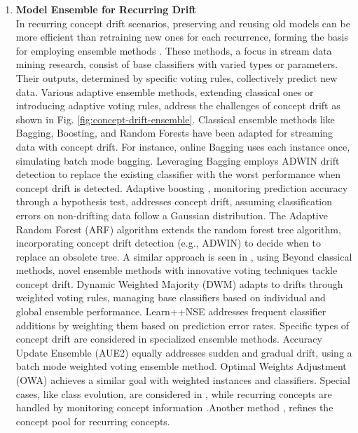 \begin{enumerate}[label=\Alph*.]
\item \textbf{Model Ensemble for Recurring Drift} \\
In recurring concept drift scenarios, preserving and reusing old models can be more efficient than retraining new ones for each recurrence, forming the basis for employing ensemble methods \cite{sun2018concept}. These methods, a focus in stream data mining research, consist of base classifiers with varied types or parameters. Their outputs, determined by specific voting rules, collectively predict new data. Various adaptive ensemble methods, extending classical ones or introducing adaptive voting rules, address the challenges of concept drift as shown in Fig. \ref{fig:concept-drift-ensemble}.
Classical ensemble methods like Bagging, Boosting, and Random Forests have been adapted for streaming data with concept drift. For instance, online Bagging \cite{oza2001experimental} uses each instance once, simulating batch mode bagging. Leveraging Bagging \cite{bifet2009new} employs ADWIN drift detection to replace the existing classifier with the worst performance when concept drift is detected.
 Adaptive boosting \cite{chu2004fast}, monitoring prediction accuracy through a hypothesis test, addresses concept drift, assuming classification errors on non-drifting data follow a Gaussian distribution. The Adaptive Random Forest (ARF) algorithm \cite{gomes2017adaptive} extends the random forest tree algorithm, incorporating concept drift detection (e.g., ADWIN) to decide when to replace an obsolete tree. A similar approach is seen in \cite{li2015learning}, using Beyond classical methods, novel ensemble methods with innovative voting techniques tackle concept drift. Dynamic Weighted Majority (DWM) \cite{kolter2007dynamic} adapts to drifts through weighted voting rules, managing base classifiers based on individual and global ensemble performance. Learn++NSE \cite{elwell2011incremental} addresses frequent classifier additions by weighting them based on prediction error rates.
 Specific types of concept drift are considered in specialized ensemble methods. Accuracy Update Ensemble (AUE2) \cite{brzezinski2013reacting} equally addresses sudden and gradual drift, using a batch mode weighted voting ensemble method. Optimal Weights Adjustment (OWA) \cite{zhang2008categorizing} achieves a similar goal with weighted instances and classifiers. Special cases, like class evolution, are considered in \cite{sun2016online}, while recurring concepts are handled by monitoring concept information \cite{gomes2013mining, gama2014survey} .Another method \cite{ahmadi2018modeling}, refines the concept pool for recurring concepts.
 

\end{enumerate}
